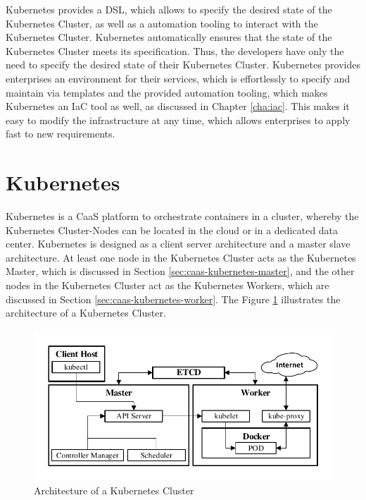 Kubernetes provides a DSL, which allows to specify the desired state of the Kubernetes Cluster, as well as a automation tooling to interact with the Kubernetes Cluster. Kubernetes automatically ensures that the state of the Kubernetes Cluster meets its specification. Thus, the developers have only the need to specify the desired state of their Kubernetes Cluster. Kubernetes provides enterprises an environment for their services, which is effortlessly to specify and maintain via templates and the provided automation tooling, which makes Kubernetes an IaC tool as well, as discussed in Chapter \vref{cha:iac}. This makes it easy to modify the infrastructure at any time, which allows enterprises to apply fast to new requirements.

\section{Kubernetes}
\label{sec:caas-kubernetes}
Kubernetes is a CaaS platform to orchestrate containers in a cluster, whereby the Kubernetes Cluster-Nodes can be located in the cloud or in a dedicated data center. Kubernetes is designed as a client server architecture and a master slave architecture. At least one node in the Kubernetes Cluster acts as the Kubernetes Master, which is discussed in Section \vref{sec:caas-kubernetes-master}, and the other nodes in the Kubernetes Cluster act as the Kubernetes Workers, which are discussed in Section \vref{sec:caas-kubernetes-worker}. The Figure \ref{fig:kubernetes-cluster-architecture} illustrates the architecture of a Kubernetes Cluster.

\begin{figure}[htbp]
	\centering
	\includegraphics[scale=1]{images/kubernetes-cluster-architecture.pdf}
	\caption{Architecture of a Kubernetes Cluster}
	\label{fig:kubernetes-cluster-architecture}
\end{figure} 

